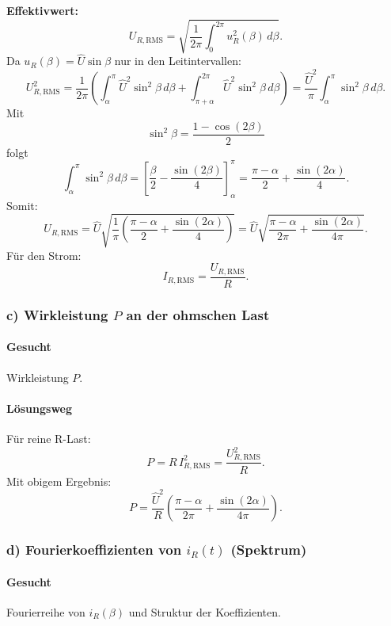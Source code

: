 \textbf{Effektivwert:}
\[
U_{R,\mathrm{RMS}}=\sqrt{\frac{1}{2\pi}\int_0^{2\pi}u_R^2(\beta)\,d\beta}.
\]
Da $u_R(\beta)=\hat U\sin\beta$ nur in den Leitintervallen:
\[
U_{R,\mathrm{RMS}}^2=\frac{1}{2\pi}\left(
\int_{\alpha}^{\pi}\hat U^2\sin^2\beta\,d\beta
+
\int_{\pi+\alpha}^{2\pi}\hat U^2\sin^2\beta\,d\beta
\right)
=\frac{\hat U^2}{\pi}\int_{\alpha}^{\pi}\sin^2\beta\,d\beta.
\]
Mit
\[
\sin^2\beta=\frac{1-\cos(2\beta)}{2}
\]
folgt
\[
\int_{\alpha}^{\pi}\sin^2\beta\,d\beta
=
\left[\frac{\beta}{2}-\frac{\sin(2\beta)}{4}\right]_{\alpha}^{\pi}
=
\frac{\pi-\alpha}{2}+\frac{\sin(2\alpha)}{4}.
\]
Somit:
\[
\boxed{
U_{R,\mathrm{RMS}}
=
\hat U \sqrt{\frac{1}{\pi}\left(\frac{\pi-\alpha}{2}+\frac{\sin(2\alpha)}{4}\right)}
=
\hat U\sqrt{\frac{\pi-\alpha}{2\pi}+\frac{\sin(2\alpha)}{4\pi}}
}.
\]
Für den Strom:
\[
\boxed{I_{R,\mathrm{RMS}}=\frac{U_{R,\mathrm{RMS}}}{R}}.
\]


\subsubsection*{c) Wirkleistung $P$ an der ohmschen Last}

\paragraph{Gesucht}
Wirkleistung $P$.

\paragraph{Lösungsweg}
Für reine R-Last:
\[
P = R\, I_{R,\mathrm{RMS}}^2=\frac{U_{R,\mathrm{RMS}}^2}{R}.
\]
Mit obigem Ergebnis:
\[
\boxed{
P
=
\frac{\hat U^2}{R}
\left(
\frac{\pi-\alpha}{2\pi}+\frac{\sin(2\alpha)}{4\pi}
\right)
}.
\]


\subsubsection*{d) Fourierkoeffizienten von $i_R(t)$ (Spektrum)}

\paragraph{Gesucht}
Fourierreihe von $i_R(\beta)$ und Struktur der Koeffizienten.


